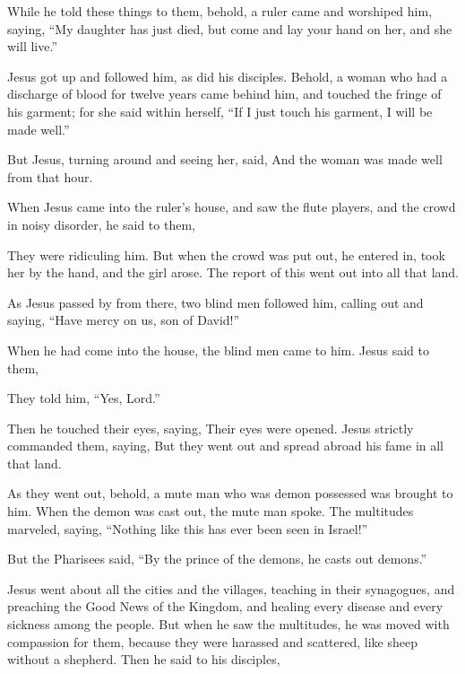{\par }{\PP {}While he told these things to them, behold, a ruler came and worshiped him, saying, “My daughter has just died, but come and lay your hand on her, and she will live.”
\par }{\PP {}Jesus got up and followed him, as did his disciples.
Behold, a woman who had a discharge of blood for twelve years came behind him, and touched the fringe of his garment;
for she said within herself, “If I just touch his garment, I will be made well.”
\par }{\PP {}But Jesus, turning around and seeing her, said,
{} And the woman was made well from that hour.
\par }{\PP {}When Jesus came into the ruler’s house, and saw the flute players, and the crowd in noisy disorder,
he said to them,
{}
\par }{\PP They were ridiculing him.
But when the crowd was put out, he entered in, took her by the hand, and the girl arose.
The report of this went out into all that land.
\par }{\PP {}As Jesus passed by from there, two blind men followed him, calling out and saying, “Have mercy on us, son of David!”
\par }{\PP {}When he had come into the house, the blind men came to him. Jesus said to them,
{}
\par }{\PP They told him, “Yes, Lord.”
\par }{\PP {}Then he touched their eyes, saying,
{}
Their eyes were opened. Jesus strictly commanded them, saying,
{}
But they went out and spread abroad his fame in all that land.
\par }{\PP {}As they went out, behold, a mute man who was demon possessed was brought to him.
When the demon was cast out, the mute man spoke. The multitudes marveled, saying, “Nothing like this has ever been seen in Israel!”
\par }{\PP {}But the Pharisees said, “By the prince of the demons, he casts out demons.”
\par }{\PP {}Jesus went about all the cities and the villages, teaching in their synagogues, and preaching the Good News of the Kingdom, and healing every disease and every sickness among the people.
But when he saw the multitudes, he was moved with compassion for them, because they were harassed and scattered, like sheep without a shepherd.
Then he said to his disciples,
{}

}
